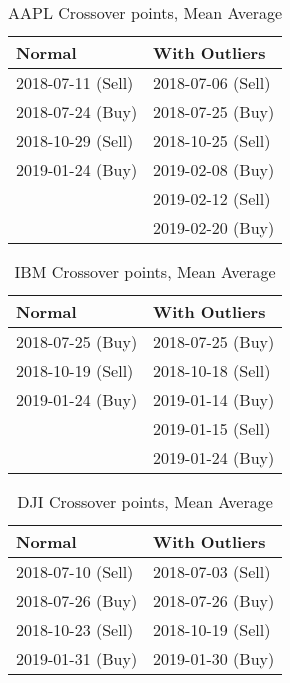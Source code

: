 \begin{table}[!htb]
    \centering
    \begin{tabular}{l|l}
    Normal            & With Outliers     \\ \hline
    2018-07-11 (Sell) & 2018-07-06 (Sell) \\
    2018-07-24 (Buy)  & 2018-07-25 (Buy)  \\
    2018-10-29 (Sell) & 2018-10-25 (Sell) \\
    2019-01-24 (Buy)  & 2019-02-08 (Buy)  \\
                      & 2019-02-12 (Sell) \\
                      & 2019-02-20 (Buy) 

    \end{tabular}
    \caption{AAPL Crossover points, Mean Average}
    \label{table:part_4:aapl_cp_mean}
\end{table}

\begin{table}[!htb]
    \centering
    \begin{tabular}{l|l}
    Normal            & With Outliers     \\ \hline
    2018-07-25 (Buy)  & 2018-07-25 (Buy) \\
    2018-10-19 (Sell) & 2018-10-18 (Sell)  \\
    2019-01-24 (Buy)  & 2019-01-14 (Buy) \\
                      & 2019-01-15 (Sell)  \\
                      & 2019-01-24 (Buy) 

    \end{tabular}
    \caption{IBM Crossover points, Mean Average}
    \label{table:part_4:ibm_cp_mean}
\end{table}

\begin{table}[!htb]
    \centering
    \begin{tabular}{l|l}
    Normal            & With Outliers     \\ \hline
    2018-07-10 (Sell) & 2018-07-03 (Sell) \\
    2018-07-26 (Buy)  & 2018-07-26 (Buy)  \\
    2018-10-23 (Sell) & 2018-10-19 (Sell) \\
    2019-01-31 (Buy)  & 2019-01-30 (Buy)  

    \end{tabular}
    \caption{DJI Crossover points, Mean Average}
    \label{table:part_4:dji_cp_mean}
\end{table}


